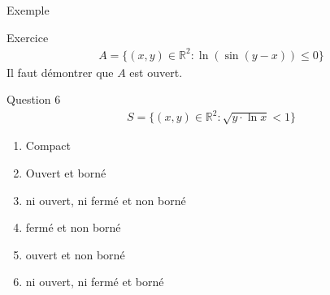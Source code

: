 \begin{parag}{Exemple}
\begin{subparag}{Exercice}
    \begin{align*}
        A = \{ (x, y) \in \mathbb{R}^2 : \ln (\sin(y-x)) \leq 0\}
    \end{align*}
    Il faut démontrer que $A$ est ouvert.
\end{subparag}
\begin{subparag}{Question 6}
        \begin{align*}
            S = \{ (x, y) \in \mathbb{R}^2: \sqrt{ y \cdot \ln x} < 1\}
        \end{align*}
        \begin{enumerate}
            \item Compact
            \item Ouvert et borné
            \item ni ouvert, ni fermé et non borné
            \item fermé et non borné
            \item ouvert et non borné
            \item ni ouvert, ni fermé et borné
        \end{enumerate}
            

\end{subparag}
\end{parag}

